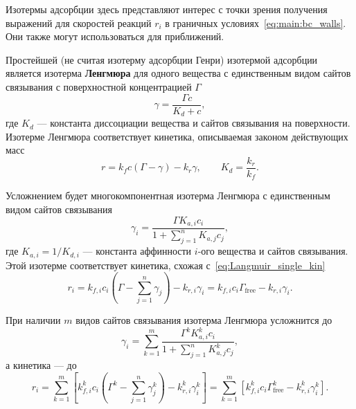 \documentclass[oneside,final,12pt]{extreport}
\begin{document}
Изотермы адсорбции здесь представляют интерес с точки зрения получения
выражений для скоростей реакций $r_i$ в
граничных условиях~\eqref{eq:main:bc_walls}.
Они также могут использоваться для приближений.

Простейшей (не считая изотерму адсорбции Генри) изотермой адсорбции является
изотерма \textbf{Ленгмюра} для одного вещества
с единственным видом сайтов связывания
с поверхностной концентрацией $\Gamma$
\begin{equation}
  \gamma = \frac{\Gamma c}{K_d + c},
\label{eq:Langmuir_single_eq}
\end{equation}
где $K_d$ --- константа диссоциации вещества и сайтов связывания на поверхности.
Изотерме Ленгмюра соответствует кинетика, описываемая законом действующих масс
\begin{equation}
  r = k_f c \left(\Gamma - \gamma\right) - k_r \gamma,\qquad K_d = \frac{k_r}{k_f}.
\label{eq:Langmuir_single_kin}
\end{equation}

Усложнением будет многокомпонентная изотерма Ленгмюра с единственным видом
сайтов связывания
\begin{equation}
  \gamma_i = \frac{\Gamma K_{a,i} c_i}{1 + \sum\limits_{j=1}^{n} K_{a,j} c_j},
\label{eq:Langmuir_multi_eq}
\end{equation}
где $K_{a,i} = 1/K_{d,i}$ --- константа аффинности $i$-ого вещества и
сайтов связывания. Этой изотерме соответствует кинетика,
схожая с~\eqref{eq:Langmuir_single_kin}
\begin{equation}
  r_i = k_{f,i} c_i \left(\Gamma - \sum_{j=1}^{n} \gamma_j\right) - k_{r,i}\gamma_i =
        k_{f,i} c_i \Gamma_{\text{free}} - k_{r,i}\gamma_i.
\label{eq:Langmuir_multi_kin}
\end{equation}

При наличии $m$ видов сайтов связывания изотерма Ленгмюра усложнится до
\begin{equation}
  \gamma_i = \sum_{k=1}^{m}\frac{\Gamma^k K_{a,i}^k c_i}{1 + \sum\limits_{j=1}^{n} K_{a,j}^k c_j},
\label{eq:Langmuir_multi_many_eq}
\end{equation}
а кинетика --- до
\begin{equation}
  r_i = \sum_{k=1}^{m} \left[
            k_{f,i}^k c_i \left(\Gamma^k - \sum_{j=1}^{n} \gamma_j^k\right) - k_{r,i}^k\gamma_i^k
          \right] =
        \sum_{k=1}^{m} \left[
            k_{f,i}^k c_i \Gamma_{\text{free}}^k - k_{r,i}^k\gamma_i^k
          \right].
\label{eq:Langmuir_multi_many_kin}
\end{equation}
\end{document}
